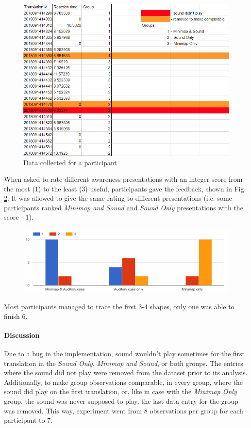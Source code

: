 \begin{figure}
	\centering
	\includegraphics[width=0.7\linewidth]{figures/final_study_data_example}
	\caption{Data collected for a participant}
	\label{fig:finalstudydataexample}
\end{figure}

When asked to rate different awareness presentations with an integer score from the most (1) to the least (3) useful, participants gave the feedback, shown in Fig. \ref{fig:finalstudyawarenesspresentationuserpreference}. It was allowed to give the same rating to different presentations (i.e. some participants ranked \textit{Minimap and Sound} and \textit{Sound Only} presentations with the score - 1).

\begin{figure}
	\centering
	\includegraphics[width=0.7\linewidth]{figures/final_study_awareness_presentation_user_preference}
	\caption{}
	\label{fig:finalstudyawarenesspresentationuserpreference}
\end{figure}

Most participants managed to trace the first 3-4 shapes, only one was able to finish 6.

\paragraph{Discussion}
Due to a bug in the implementation, sound wouldn't play sometimes for the first translation in the \textit{Sound Only}, \textit{Minimap and Sound}, or both groups. The entries where the sound did not play were removed from the dataset prior to its analysis. Additionally, to make group observations comparable, in every group, where the sound did play on the first translation, or, like in case with the \textit{Minimap Only} group, the sound was never supposed to play, the last data entry for the group was removed. This way, experiment went from 8 observations per group for each participant to 7.


